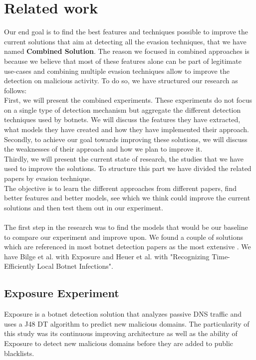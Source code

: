 \section{Related work}
Our end goal is to find the best features and techniques possible to improve the current solutions that aim at detecting all the evasion techniques, that we have named \textbf{Combined Solution}. The reason we focused in combined approaches is because we believe that most of these features alone can be part of legitimate use-cases and combining multiple evasion techniques allow to improve the detection on malicious activity. To do so, we have structured our research as follows:\\
First, we will present the combined experiments. These experiments do not focus on a single type of detection mechanism but aggregate the different detection techniques used by botnets. We will discuss the features they have extracted, what models they have created and how they have implemented their approach.\\
Secondly, to achieve our goal towards improving these solutions, we will discuss the weaknesses of their approach and how we plan to improve it.\\
Thirdly, we will present the current state of research, the studies that we have used to improve the solutions. To structure this part we have divided the related papers by evasion technique.\\
The objective is to learn the different approaches from different papers, find better features and better models, see which we think could improve the current solutions and then test them out in our experiment.\\
\\
The first step in the research was to find the models that would be our baseline to compare our experiment and improve upon. We found a couple of solutions which are referenced in most botnet detection papers as the most extensive . We have Bilge et al.\cite{exposure} with Exposure and Heuer et al.\cite{localbotnet} with "Recognizing Time-Efficiently Local Botnet Infections".

\subsection{Exposure Experiment}
Exposure is a botnet detection solution that analyzes passive DNS traffic and uses a J48 DT algorithm to predict new malicious domains. The particularity of this study was its continuous improving architecture as well as the ability of Exposure to detect new malicious domains before they are added to public blacklists.
